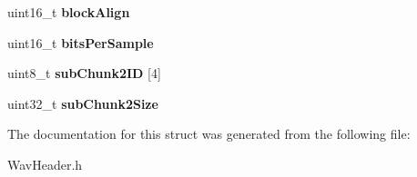 \begin{DoxyCompactItemize}
\item 
\mbox{\label{structWAV__HEADER_a76dfa6919ab8e0c0e23e3b5086fd0532}} 
uint16\+\_\+t {\bfseries block\+Align}
\item 
\mbox{\label{structWAV__HEADER_a69b1f7eaf6fa6710872af779cfd0253f}} 
uint16\+\_\+t {\bfseries bits\+Per\+Sample}
\item 
\mbox{\label{structWAV__HEADER_a87e9d2fc7ff40ef3657a6c0bae7617ab}} 
uint8\+\_\+t {\bfseries sub\+Chunk2\+ID} \mbox{[}4\mbox{]}
\item 
\mbox{\label{structWAV__HEADER_a9e1b5c8c847a53a44b3fe9f304d5bab1}} 
uint32\+\_\+t {\bfseries sub\+Chunk2\+Size}
\end{DoxyCompactItemize}


The documentation for this struct was generated from the following file\+:\begin{DoxyCompactItemize}
\item 
Wav\+Header.\+h\end{DoxyCompactItemize}
